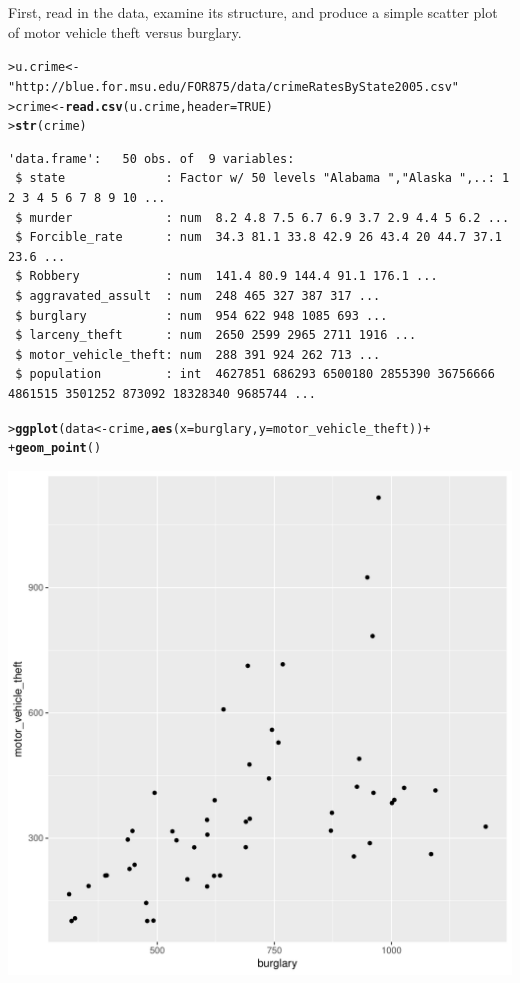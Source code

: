 \documentclass[12pt,oneside]{book}\usepackage[]{graphicx}\usepackage[]{color}
\makeatletter
\def\maxwidth{ %
  \ifdim\Gin@nat@width>\linewidth
    \linewidth
  \else
    \Gin@nat@width
  \fi
}
\newcommand{\hlnum}[1]{\textcolor[rgb]{0.686,0.059,0.569}{#1}}%
\newcommand{\hlstr}[1]{\textcolor[rgb]{0.192,0.494,0.8}{#1}}%
\newcommand{\hlopt}[1]{\textcolor[rgb]{0,0,0}{#1}}%
\newcommand{\hlstd}[1]{\textcolor[rgb]{0.345,0.345,0.345}{#1}}%
\newcommand{\hlkwb}[1]{\textcolor[rgb]{0.69,0.353,0.396}{#1}}%
\newcommand{\hlkwc}[1]{\textcolor[rgb]{0.333,0.667,0.333}{#1}}%
\newcommand{\hlkwd}[1]{\textcolor[rgb]{0.737,0.353,0.396}{\textbf{#1}}}%
\newenvironment{kframe}{%
 \def\at@end@of@kframe{}%
 \ifinner\ifhmode%
  \def\at@end@of@kframe{\end{minipage}}%
  \begin{minipage}{\columnwidth}%
 \fi\fi%
 \def\FrameCommand##1{\hskip\@totalleftmargin \hskip-\fboxsep
 \colorbox{shadecolor}{##1}\hskip-\fboxsep
     \hskip-\linewidth \hskip-\@totalleftmargin \hskip\columnwidth}%
 \MakeFramed {\advance\hsize-\width
   \@totalleftmargin\z@ \linewidth\hsize
   \@setminipage}}%
 {\par\unskip\endMakeFramed%
 \at@end@of@kframe}
\newenvironment{knitrout}{}{} %
\makeatother
\begin{document}
First, read in the data, examine its structure, and produce a simple scatter plot of motor vehicle theft versus burglary.
\begin{knitrout}
\color{fgcolor}\begin{kframe}
\begin{alltt}
\hlstd{> }\hlstd{u.crime} \hlkwb{<-} \hlstr{"http://blue.for.msu.edu/FOR875/data/crimeRatesByState2005.csv"}
\hlstd{> }\hlstd{crime} \hlkwb{<-} \hlkwd{read.csv}\hlstd{(u.crime,} \hlkwc{header}\hlstd{=}\hlnum{TRUE}\hlstd{)}
\hlstd{> }\hlkwd{str}\hlstd{(crime)}
\end{alltt}
\begin{verbatim}
'data.frame':	50 obs. of  9 variables:
 $ state              : Factor w/ 50 levels "Alabama ","Alaska ",..: 1 2 3 4 5 6 7 8 9 10 ...
 $ murder             : num  8.2 4.8 7.5 6.7 6.9 3.7 2.9 4.4 5 6.2 ...
 $ Forcible_rate      : num  34.3 81.1 33.8 42.9 26 43.4 20 44.7 37.1 23.6 ...
 $ Robbery            : num  141.4 80.9 144.4 91.1 176.1 ...
 $ aggravated_assult  : num  248 465 327 387 317 ...
 $ burglary           : num  954 622 948 1085 693 ...
 $ larceny_theft      : num  2650 2599 2965 2711 1916 ...
 $ motor_vehicle_theft: num  288 391 924 262 713 ...
 $ population         : int  4627851 686293 6500180 2855390 36756666 4861515 3501252 873092 18328340 9685744 ...
\end{verbatim}
\begin{alltt}
\hlstd{> }\hlkwd{ggplot}\hlstd{(data} \hlkwb{<-} \hlstd{crime,} \hlkwd{aes}\hlstd{(}\hlkwc{x} \hlstd{= burglary,} \hlkwc{y} \hlstd{= motor_vehicle_theft))} \hlopt{+}
\hlstd{+ }    \hlkwd{geom_point}\hlstd{()}
\end{alltt}
\end{kframe}
\includegraphics[width=\maxwidth]{figure/unnamed-chunk-70-1} 

\end{knitrout}
\end{document}

